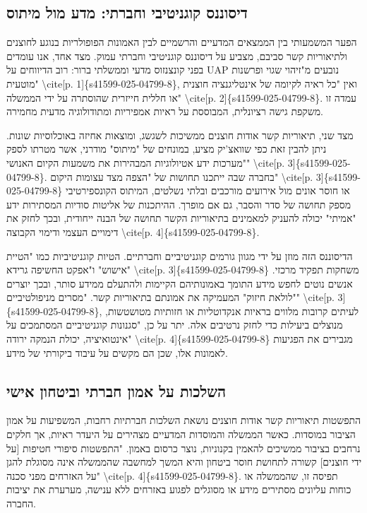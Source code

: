 \documentclass[12pt,a4paper]{article}
\begin{document}
\subsection{דיסוננס קוגניטיבי וחברתי: מדע מול מיתוס}
הפער המשמעותי בין הממצאים המדעיים והרשמיים לבין האמונות הפופולריות בנוגע לחוצנים ולתיאוריות קשר סביבם, מצביע על דיסוננס קוגניטיבי וחברתי עמוק. מצד אחד, אנו עומדים בפני קונצנזוס מדעי וממשלתי ברור: רוב הדיווחים על UAP נובעים מ"זיהוי שגוי ופרשנות מוטעית" \textbackslash{}cite[p. 1]\{s41599-025-04799-8\}, ואין "כל ראיה לקיומה של אינטליגנציה חוצנית או חללית חייזרית שהוסתרה על ידי הממשלה" \textbackslash{}cite[p. 2]\{s41599-025-04799-8\}. עמדה זו משקפת גישה רציונלית, המבוססת על ראיות אמפיריות ומתודולוגיה מדעית מחמירה.

מצד שני, תיאוריות קשר אודות חוצנים ממשיכות לשגשג, ומוצאות אחיזה באוכלוסיות שונות. ניתן להבין זאת כפי שוואצ'יק מציע, במונחים של "מיתוס" מודרני, אשר מטרתו לספק "מערכות ידע אטיולוגיות המבהירות את משמעות הקיום האנושי" \textbackslash{}cite[p. 3]\{s41599-025-04799-8\}. בחברה שבה ייתכנו תחושות של "הצפה מצד עצומות היקום" \textbackslash{}cite[p. 3]\{s41599-025-04799-8\} או חוסר אונים מול אירועים מורכבים ובלתי נשלטים, המיתוס הקונספירטיבי מספק תחושה של סדר והסבר, גם אם מופרך. ההיתכנות של אליטות סודיות המסתירות ידע "אמיתי" יכולה להעניק למאמינים בתיאוריות הקשר תחושה של הבנה ייחודית, ובכך לחזק את דימויים העצמי ודימוי הקבוצה \textbackslash{}cite[p. 4]\{s41599-025-04799-8\}.

הדיסוננס הזה מוזן על ידי מגוון גורמים קוגניטיביים וחברתיים. הטיות קוגניטיביות כמו "הטיית אישוש" ו"אפקט החשיפה גרידא" \textbackslash{}cite[p. 3]\{s41599-025-04799-8\} משחקות תפקיד מרכזי. אנשים נוטים לחפש מידע התומך באמונותיהם הקיימות ולהתעלם ממידע סותר, ובכך יוצרים "לולאת חיזוק" המעמיקה את אמונתם בתיאוריות קשר. "מסרים מניפולטיביים" \textbackslash{}cite[p. 3]\{s41599-025-04799-8\}, לעיתים קרובות מלווים בראיות אנקדוטליות או חזותיות מטושטשות, מנוצלים ביעילות כדי לחזק נרטיבים אלה. יתר על כן, "סגנונות קוגניטיביים המסתמכים על אינטואיציה, יכולת הנמקה ירודה" \textbackslash{}cite[p. 4]\{s41599-025-04799-8\} מגבירים את הפגיעות לאמונות אלו, שכן הם מקשים על עיבוד ביקורתי של מידע.

\subsection{השלכות על אמון חברתי וביטחון אישי}
התפשטות תיאוריות קשר אודות חוצנים נושאת השלכות חברתיות רחבות, המשפיעות על אמון הציבור במוסדות. כאשר הממשלה והמוסדות המדעיים מצהירים על היעדר ראיות, אך חלקים נרחבים בציבור ממשיכים להאמין בקנוניות, נוצר כרסום באמון. "התפשטות סיפורי חטיפות [על ידי חוצנים] קשורה לתחושת חוסר ביטחון והיא המשך למחשבה שהממשלה אינה מסוגלת להגן על האזרחים מפני סכנה" \textbackslash{}cite[p. 4]\{s41599-025-04799-8\}. תפיסה זו, שהממשלה או כוחות עליונים מסתירים מידע או מסוגלים לפגוע באזרחים ללא ענישה, מערערת את יציבות החברה.
\end{document}
